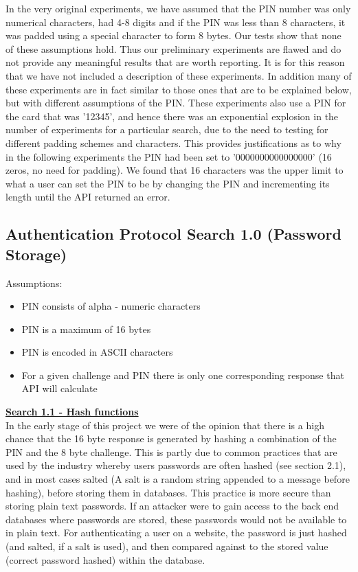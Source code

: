 \documentclass[bsc,frontabs,twoside,singlespacing,parskip,deptreport]{infthesis}     %
\begin{document}
In the very original experiments, we have assumed that the PIN number was only numerical characters, had 4-8 digits and if the PIN was less than 8 characters, it was padded using a special character to form 8 bytes. Our tests show that none of these assumptions hold. Thus our preliminary experiments are flawed and do not provide any meaningful results that are worth reporting. It is for this reason that we have not included a description of these experiments. In addition many of these experiments are in fact similar to those ones that are to be explained below, but with different assumptions of the PIN. These experiments also use a PIN for the card that was '12345', and hence there was an exponential explosion in the number of experiments for a particular search, due to the need to testing for different padding schemes and characters. This provides justifications as to why in the following experiments the PIN had been set to '0000000000000000' (16 zeros, no need for padding). We found that 16 characters was the upper limit to what a user can set the PIN to be by changing the PIN and incrementing its length until the API returned an error.


\subsection{Authentication Protocol Search 1.0 (Password Storage)}
Assumptions:
\begin{itemize}
\item PIN consists of alpha - numeric characters
\item PIN is a maximum of 16 bytes
\item PIN is encoded in ASCII characters
\item For a given challenge and PIN there is only one corresponding response that API will calculate\\
\end{itemize}

\textbf{\underline{Search 1.1 - Hash functions}}\\
In the early stage of this project we were of the opinion that there is a high chance that the 16 byte response is generated by hashing a combination of the PIN and the 8 byte challenge. This is partly due to common practices that are used by the industry whereby users passwords are often hashed (see section 2.1), and in most cases salted (A salt is a random string appended to a message before hashing), before storing them in databases. This practice is more secure than storing plain text passwords. If an attacker were to gain access to the back end databases  where passwords are stored, these passwords would not be available to in plain text. For authenticating a user on a website, the password is just hashed (and salted, if a salt is used), and then compared against to the stored value (correct password hashed) within the database. 
\end{document}
